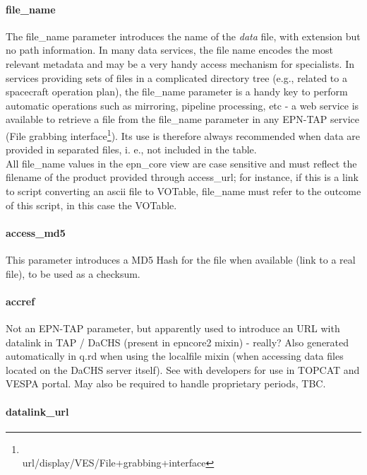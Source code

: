 \documentclass[11pt,a4paper]{ivoa}
\begin{document}
\paragraph{file\_name}

The file\_name parameter introduces the name of the \emph{data} file, with extension but no path information. In many data services, the file name encodes the most relevant metadata and may be a very handy access mechanism for specialists. In services providing sets of files in a complicated directory tree (e.g., related to a spacecraft operation plan), the file\_name parameter is a handy key to perform automatic operations such as mirroring, pipeline processing, etc - a web service is available to retrieve a file from the file\_name parameter in any EPN-TAP service (File grabbing interface\footnote{\\url{/display/VES/File+grabbing+interface}}). Its use is therefore always recommended when data are provided in separated files, i. e., not included in the table.\\All file\_name values in the epn\_core view are case sensitive and must reflect the filename of the product provided through access\_url; for instance, if this is a link to script converting an ascii file to VOTable, file\_name must refer to the outcome of this script, in this case the VOTable.

\paragraph{access\_md5}

This parameter introduces a MD5 Hash for the file when available (link to a real file), to be used as a checksum.\\

\paragraph{accref}

Not an EPN-TAP parameter, but apparently used to introduce an URL with datalink in TAP / DaCHS (present in epncore2 mixin) - really? Also generated automatically in q.rd when using the localfile mixin (when accessing data files located on the DaCHS server itself). See with developers for use in TOPCAT and VESPA portal. May also be required to handle proprietary periods, TBC. \\

\paragraph{datalink\_url}
\end{document}
